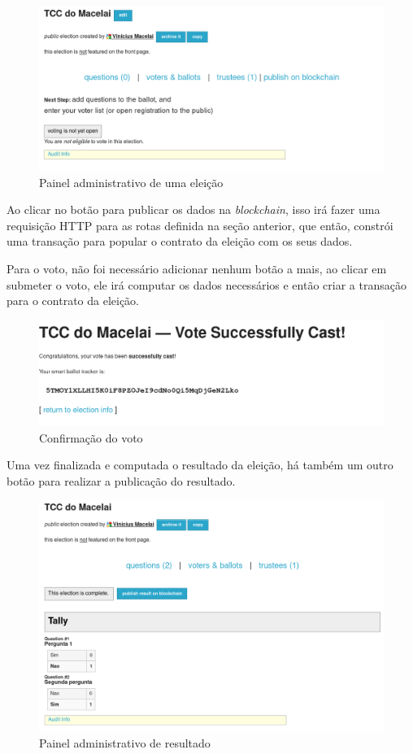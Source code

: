 \documentclass{ufsctex/ufsctex}
\begin{document}
\begin{figure}[]
	\centering
	\includegraphics[width=\linewidth]{helios-1}
	\caption{Painel administrativo de uma eleição}
	\label{fig:helios-1}
\end{figure}

Ao clicar no botão para publicar os dados na \textit{blockchain}, isso irá
fazer uma requisição HTTP para as rotas definida na seção anterior, que
então, constrói uma transação para popular o contrato da eleição com os seus
dados.

Para o voto, não foi necessário adicionar nenhum botão a mais, ao clicar em
submeter o voto, ele irá computar os dados necessários e então criar a
transação para o contrato da eleição.

\begin{figure}[H]
	\centering
	\includegraphics[width=\linewidth]{helios-voting}
	\caption{Confirmação do voto}
	\label{fig:helios-2}
\end{figure}

Uma vez finalizada e computada o resultado da eleição, há também um outro botão
para realizar a publicação do resultado.

\begin{figure}[H]
	\centering
	\includegraphics[width=\linewidth]{helios-2}
	\caption{Painel administrativo de resultado}
	\label{fig:helios-2}
\end{figure}
\end{document}
